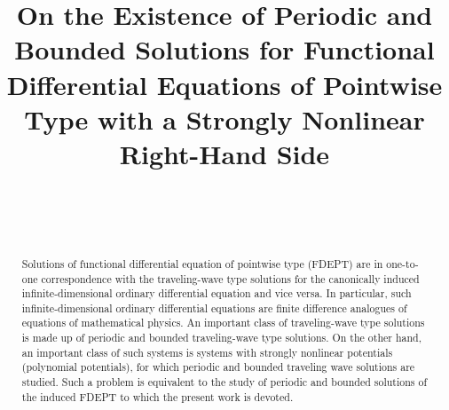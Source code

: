 \documentclass[
11pt,%
tightenlines,%
twoside,%
onecolumn,%
nofloats,%
nobibnotes,%
nofootinbib,%
superscriptaddress,%
noshowpacs,%
centertags,aps]%
{revtex4}
\begin{document}

\title{On the Existence of Periodic and Bounded Solutions for Functional Differential Equations of Pointwise Type with a Strongly Nonlinear Right-Hand Side}

\author{~}

\author{~}


\received{\today} %

\begin{abstract} %
Solutions of functional differential equation of pointwise type (FDEPT) are in one-to-one correspondence with the traveling-wave type solutions for the canonically induced infinite-dimensional ordinary differential equation and vice versa. In particular, such infinite-dimensional ordinary differential equations are finite difference analogues of equations of mathematical physics. An important class of traveling-wave type solutions is made up of periodic and bounded traveling-wave type solutions. On the other hand, an important class of such systems is systems with strongly nonlinear potentials (polynomial potentials), for which periodic and bounded traveling wave solutions are studied. Such a problem is equivalent to the study of periodic and bounded solutions of the induced FDEPT to which the present work is devoted.
\end{abstract}


\end{document}
